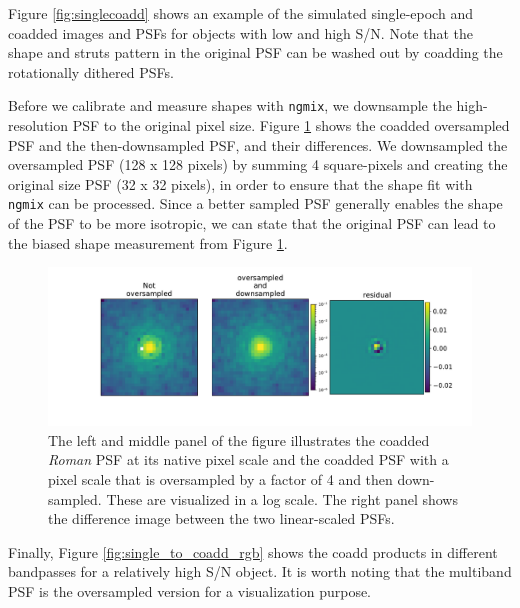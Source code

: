 {Figure \ref{fig:singlecoadd} shows an example of the simulated single-epoch and coadded images and PSFs for objects with low and high S/N. Note that the shape and struts pattern in the original PSF can be washed out by coadding the rotationally dithered PSFs. 


Before we calibrate and measure shapes with \texttt{ngmix}, we downsample the high-resolution PSF to the original pixel size. Figure \ref{fig:coadd_oversample_res} shows the coadded oversampled PSF and the then-downsampled PSF, and their differences. We downsampled the oversampled PSF (128 x 128 pixels) by summing 4 square-pixels and creating the original size PSF (32 x 32 pixels), in order to ensure that the shape fit with \texttt{ngmix} can be processed. Since a better sampled PSF generally enables the shape of the PSF to be more isotropic, we can state that the original PSF can lead to the biased shape measurement from Figure \ref{fig:coadd_oversample_res}. 

\begin{figure}
	\includegraphics[width=\columnwidth]{figure3.pdf}
    \vspace*{-5mm}
    \caption{The left and middle panel of the figure illustrates the coadded \emph{Roman} PSF at its native pixel scale and the coadded PSF with a pixel scale that is oversampled by a factor of 4 and then down-sampled. These are visualized in a log scale. The right panel shows the difference image between the two linear-scaled PSFs. }
    \label{fig:coadd_oversample_res}
\end{figure}

Finally, Figure \ref{fig:single_to_coadd_rgb} shows the coadd products in different bandpasses for a relatively high S/N object. It is worth noting that the multiband PSF is the oversampled version for a visualization purpose. 

}
